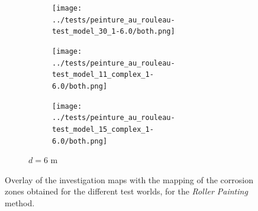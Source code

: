 \documentclass[english,RandD]{rapportPFE}  %
\begin{document}
\begin{figure}[H]
\begin{subfigure}[t]{\linewidth}
\begin{subfigure}[t]{0.11\linewidth}
					\texttt{[image: ../tests/peinture\_au\_rouleau-test\_model\_30\_1-6.0/both.png]}
				\end{subfigure}
				\hfill
				\begin{subfigure}[t]{0.11\linewidth}
					\texttt{[image: ../tests/peinture\_au\_rouleau-test\_model\_11\_complex\_1-6.0/both.png]}
				\end{subfigure}
				\hfill
				\begin{subfigure}[t]{0.11\linewidth}
					\texttt{[image: ../tests/peinture\_au\_rouleau-test\_model\_15\_complex\_1-6.0/both.png]}
				\end{subfigure}
				\caption{$d = 6$ m}
			\end{subfigure}
			\caption{Overlay of the investigation maps with the mapping of the corrosion zones obtained for the different test worlds, for the \textit{Roller Painting} method.}
			\label{fig:peinture_au_rouleau_resultats}
		\end{figure}
\end{document}
